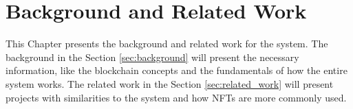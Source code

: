 \chapter{Background and Related Work}
\label{ch:background_and_related_work}

This Chapter presents the background and related work for the system. The
background in the Section \ref{sec:background} will present the necessary
information, like the blockchain concepts and the fundamentals of how the
entire system works. The related work in the Section \ref{sec:related_work}
will present projects with similarities to the system and how NFTs are more
commonly used.




